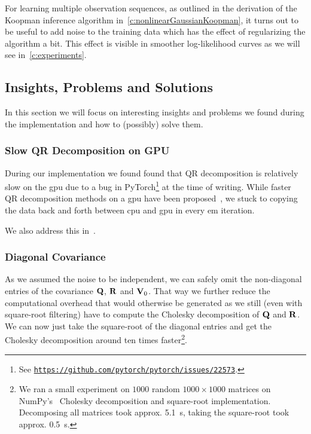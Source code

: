 	For learning multiple observation sequences, as outlined in the derivation of the Koopman inference algorithm in~\autoref{c:nonlinearGaussianKoopman}, it turns out to be useful to add noise to the training data which has the effect of regularizing the algorithm a bit. This effect is visible in smoother log-likelihood curves as we will see in~\autoref{c:experiments}.


	\subsection{Insights, Problems and Solutions}
		In this section we will focus on interesting insights and problems we found during the implementation and how to (possibly) solve them.

		\subsubsection{Slow QR Decomposition on GPU}
			During our implementation we found found that QR decomposition is relatively slow on the \ac{gpu} due to a bug in PyTorch\footnote{See \href{https://web.archive.org/web/20201110121407/https://github.com/pytorch/pytorch/issues/22573}{\texttt{https://github.com/pytorch/pytorch/issues/22573}}.} at the time of writing. While faster QR decomposition methods on a \ac{gpu} have been proposed~\cite{andersonCommunicationAvoidingQRDecomposition2011a}, we stuck to copying the data back and forth between \ac{cpu} and \ac{gpu} in every \ac{em} iteration.

			We also address this in~.

		\subsubsection{Diagonal Covariance}
			As we assumed the noise to be independent, we can safely omit the non-diagonal entries of the covariance \( \boldsymbol{\mathrm{Q}} \), \( \boldsymbol{\mathrm{R}} \) and \( \boldsymbol{\mathrm{V}}_0 \). That way we further reduce the computational overhead that would otherwise be generated as we still (even with square-root filtering) have to compute the Cholesky decomposition of \( \boldsymbol{\mathrm{Q}} \) and \( \boldsymbol{\mathrm{R}} \). We can now just take the square-root of the diagonal entries and get the Cholesky decomposition around ten times faster\footnote{We ran a small experiment on \(1000\) random \( 1000 \times 1000 \) matrices on NumPy's~\cite{harrisArrayProgrammingNumPy2020} Cholesky decomposition and square-root implementation. Decomposing all matrices took approx. \SI{5.1}{\second}, taking the square-root took approx. \SI{0.5}{\second}.}.

